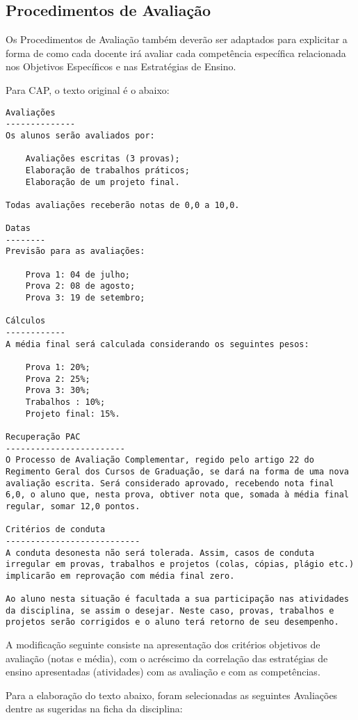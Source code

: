\documentclass[12pt, oneside]{book}
\begin{document}
\subsection*{Procedimentos de Avaliação}
Os Procedimentos de Avaliação também deverão ser adaptados para explicitar a forma de como cada docente irá avaliar cada competência específica relacionada nos Objetivos Específicos e nas Estratégias de Ensino. 

Para CAP, o texto original é o abaixo:
\begin{lstlisting}
Avaliações
--------------
Os alunos serão avaliados por:

    Avaliações escritas (3 provas);
    Elaboração de trabalhos práticos;
    Elaboração de um projeto final.

Todas avaliações receberão notas de 0,0 a 10,0.

Datas
--------
Previsão para as avaliações:

    Prova 1: 04 de julho;
    Prova 2: 08 de agosto;
    Prova 3: 19 de setembro;

Cálculos
------------
A média final será calculada considerando os seguintes pesos:

    Prova 1: 20%;
    Prova 2: 25%;
    Prova 3: 30%;
    Trabalhos : 10%;
    Projeto final: 15%.

Recuperação PAC
------------------------
O Processo de Avaliação Complementar, regido pelo artigo 22 do Regimento Geral dos Cursos de Graduação, se dará na forma de uma nova avaliação escrita. Será considerado aprovado, recebendo nota final 6,0, o aluno que, nesta prova, obtiver nota que, somada à média final regular, somar 12,0 pontos.

Critérios de conduta
---------------------------
A conduta desonesta não será tolerada. Assim, casos de conduta irregular em provas, trabalhos e projetos (colas, cópias, plágio etc.) implicarão em reprovação com média final zero.

Ao aluno nesta situação é facultada a sua participação nas atividades da disciplina, se assim o desejar. Neste caso, provas, trabalhos e projetos serão corrigidos e o aluno terá retorno de seu desempenho.
\end{lstlisting}

A modificação seguinte consiste na apresentação dos critérios objetivos de avaliação (notas e média), com o acréscimo da correlação das estratégias de ensino apresentadas (atividades) com as avaliação e com as competências.

Para a elaboração do texto abaixo, foram selecionadas as seguintes Avaliações dentre as sugeridas na ficha da disciplina:
\end{document}
